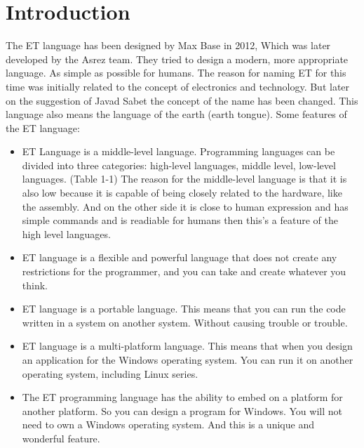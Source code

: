 \documentclass[11pt,fleqn]{book}
\begin{document}
\section{Introduction}

The ET language has been designed by Max Base in 2012, Which was later developed by the Asrez team. They tried to design a modern, more appropriate language. As simple as possible for humans. The reason for naming ET for this time was initially related to the concept of electronics and technology. But later on the suggestion of Javad Sabet the concept of the name has been changed. This language also means the language of the earth (earth tongue). Some features of the ET language:


	\begin{itemize}
		\item ET Language is a middle-level language. Programming languages ​​can be divided into three categories: high-level languages, middle level, low-level languages. (Table 1-1) The reason for the middle-level language is that it is also low because it is capable of being closely related to the hardware, like the assembly. And on the other side it is close to human expression and has simple commands and is readiable for humans then this's a feature of the high level languages.
		
		\item ET language is a flexible and powerful language that does not create any restrictions for the programmer, and you can take and create whatever you think.
		
		\item ET language is a portable language. This means that you can run the code written in a system on another system. Without causing trouble or trouble.
		
		\item ET language is a multi-platform language. This means that when you design an application for the Windows operating system. You can run it on another operating system, including Linux series.
		
		\item The ET programming language has the ability to embed on a platform for another platform.
		So you can design a program for Windows. You will not need to own a Windows operating system.
		And this is a unique and wonderful feature.
		

\end{itemize}
\end{document}
